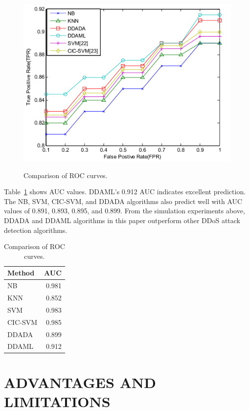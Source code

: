 \documentclass[12pt]{report}
\begin{document}
\begin{figure}[H]
    \centering
    \includegraphics[scale=0.4]{fig30.png}\\
    \caption{Comparison of ROC curves.}
    \label{fig:rccur}
\end{figure}

Table~\ref{tab:croc} shows AUC values. DDAML's 0.912 AUC indicates excellent prediction. The NB, SVM, CIC-SVM, and DDADA algorithms also predict well with AUC values of 0.891, 0.893, 0.895, and 0.899. From the simulation experiments above, DDADA and DDAML algorithms in this paper outperform other DDoS attack detection algorithms.

\begin{table}[H]
    \centering
    \begin{tabular}{l r}
    \toprule
    Method & AUC \\
    \midrule
    NB & 0.981 \\
    KNN & 0.852  \\
    SVM & 0.983 \\
    CIC-SVM & 0.985 \\
    DDADA & 0.899 \\
    DDAML & 0.912 \\
    \bottomrule
    \end{tabular}
    \caption{Comparison of ROC curves.}
    \label{tab:croc}
\end{table}

\section{ADVANTAGES AND LIMITATIONS}
\end{document}
